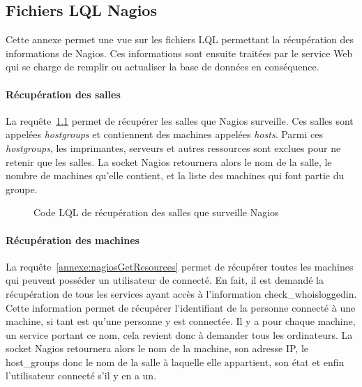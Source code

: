 \begin{appendices}

\chapter{Fichiers LQL Nagios}
\label{chapterAnnexe:fichiersLQLNagios}

Cette annexe permet une vue sur les fichiers LQL permettant la r\'ecup\'eration des informations de Nagios. 
Ces informations sont ensuite trait\'ees par le service Web qui se charge de remplir ou actualiser la base de donn\'ees en cons\'equence.

\subsubsection{R\'ecup\'eration des salles}

La requ\^ete~\ref{annexe:nagiosGetHostGroups} permet de r\'ecup\'erer les salles que Nagios surveille.
Ces salles sont appel\'ees \textit{hostgroups} et contiennent des machines appel\'ees \textit{hosts}.
Parmi ces \textit{hostgroups}, les imprimantes, serveurs et autres ressources sont exclues pour ne retenir que les salles.
La socket Nagios retournera alors le nom de la salle, le nombre de machines qu'elle contient, et la liste des machines qui font partie du groupe.

\vspace{0.20cm}

\begin{figure}[!ht]
	
	\caption{Code LQL de r\'ecup\'eration des salles que surveille Nagios}
	\label{annexe:nagiosGetHostGroups}

\end{figure}

\subsubsection{R\'ecup\'eration des machines}

La requ\^ete~\ref{annexe:nagiosGetResources} permet de r\'ecup\'erer toutes les machines qui peuvent poss\'eder un utilisateur de connect\'e.
En fait, il est demand\'e la r\'ecup\'eration de tous les services ayant acc\`es \`a l'information \textsf{check\_whoisloggedin}.
Cette information permet de r\'ecup\'erer l'identifiant de la personne connect\'e \`a une machine, si tant est qu'une personne y est connect\'ee.
Il y a pour chaque machine, un service portant ce nom, cela revient donc \`a demander tous les ordinateurs.
La socket Nagios retournera alors le nom de la machine, son adresse IP, le \textsf{host\_groups} donc le nom de la salle \`a laquelle elle appartient, son \'etat et enfin l'utilisateur connect\'e s'il y en a un.


\end{appendices}
